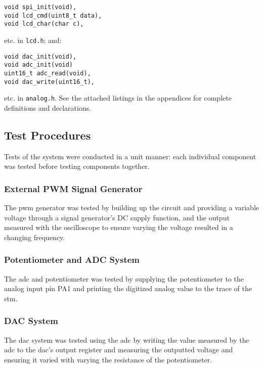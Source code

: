 \begin{lstlisting}[numbers=none]
void spi_init(void),
void lcd_cmd(uint8_t data),
void lcd_char(char c),
\end{lstlisting}

etc. in \lstinline{lcd.h}; and:

\begin{lstlisting}[numbers=none]
void dac_init(void),
void adc_init(void)
uint16_t adc_read(void),
void dac_write(uint16_t),
\end{lstlisting}

etc. in \lstinline{analog.h}. See the attached listings in the
appendices for complete definitions and declarations.





\subsection{Test Procedures}
Tests of the system were conducted in a unit manner: each individual
component was tested before testing components together.

\subsubsection{External PWM Signal Generator}
The \gls{pwm} generator was tested by building up the circuit and
providing a variable voltage through a signal generator's DC supply
function, and the output measured with the oscilloscope to ensure
varying the voltage resulted in a changing frequency.

\subsubsection{Potentiometer and ADC System}
The \gls{adc} and potentiometer was tested by supplying the
potentiometer to the analog input pin PA1 and printing the digitized
analog value to the trace of the \gls{stm}.

\subsubsection{DAC System}
The \gls{dac} system was tested using the \gls{adc} by writing the value
measured by the \gls{adc} to the \gls{dac}'s output register and
measuring the outputted voltage and ensuring it varied with varying
the resistance of the potentiometer.

